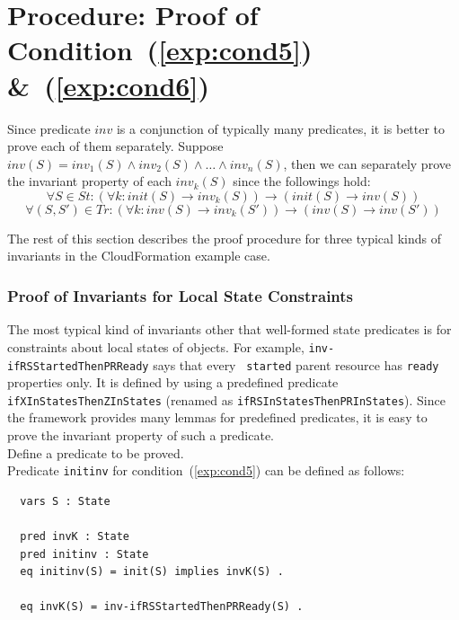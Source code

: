 \documentclass[12pt]{report}
\newcommand{\ra}{\rightarrow}
\begin{document}
\section{Procedure: Proof of Condition~(\ref{exp:cond5}) \&~(\ref{exp:cond6})}
\label{sec:invariant}
Since predicate $inv$ is a conjunction of typically many predicates, it is
better to prove each of them separately. Suppose $inv(S) =
inv_1(S)\land inv_2(S)\land\dots\land inv_n(S)$, then we can
separately prove the invariant property of each $inv_k(S)$ since the
followings hold:
\[\forall S\in St: (\forall k:init(S)\ra inv_k(S))\ra(init(S)\ra inv(S))\]
\[\forall (S,S')\in T\!r: (\forall k:inv(S)\ra inv_k(S'))\ra(inv(S)\ra inv(S'))\]

\vspace{0.3cm}
The rest of this section describes the proof procedure for three
typical kinds of invariants in the CloudFormation example case.

\subsubsection*{Proof of Invariants for Local State Constraints}
The most typical kind of invariants other that well-formed state
predicates is for constraints about local states of objects.  For
example, {\tt inv-ifRSStartedThenPRReady} says that every {\tt
  started} parent resource has {\tt ready} properties only.  It is
defined by using a predefined predicate {\tt ifXInStatesThenZInStates}
(renamed as {\tt ifRSInStatesThenPRInStates}). Since the framework
provides many lemmas for predefined predicates, it is easy to
prove the invariant property of such a predicate. \\

 Define a predicate to be proved. \\ Predicate
         {\tt initinv} for condition~(\ref{exp:cond5}) can be defined
         as follows:
\small
\begin{verbatim}
  vars S : State

  pred invK : State
  pred initinv : State
  eq initinv(S) = init(S) implies invK(S) .

  eq invK(S) = inv-ifRSStartedThenPRReady(S) .
\end{verbatim}
\normalsize
\end{document}
